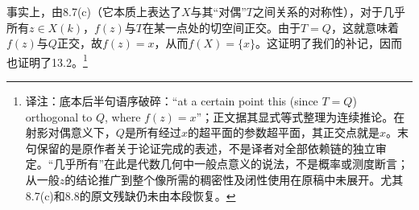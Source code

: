 \documentclass[openany,fontset=fandol]{ctexbook}
\newcommand{\note}[1]{\footnote{译注：#1}}
\begin{document}
事实上，由8.7(c)（它本质上表达了$X$与其“对偶”$T$之间关系的对称性），对于几乎所有$z\in X(k)$，$f(z)$与$T$在某一点处的切空间正交。由于$T=Q$，这就意味着$f(z)$与$Q$正交，故$f(z)=x$，从而$f(X)=\{x\}$。这证明了我们的补记，因而也证明了13.2。\note{底本后半句语序破碎：“at a certain point this (since $T=Q$) orthogonal to $Q$, where $f(z)=x$”；正文据其显式等式整理为连续推论。在射影对偶意义下，$Q$是所有经过$x$的超平面的参数超平面，其正交点就是$x$。末句保留的是原作者关于论证完成的表述，不是译者对全部依赖链的独立审定。“几乎所有”在此是代数几何中一般点意义的说法，不是概率或测度断言；从一般$z$的结论推广到整个像所需的稠密性及闭性使用在原稿中未展开。尤其8.7(c)和8.8的原文残缺仍未由本段恢复。}
\end{document}
